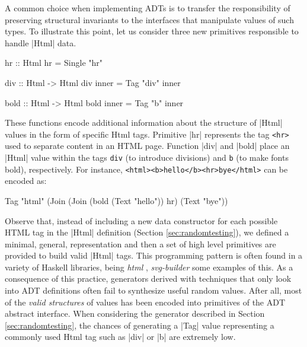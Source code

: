A common choice when implementing ADTs is to transfer the responsibility of
preserving structural invariants to the interfaces that manipulate values of
such types.
%
To illustrate this point, let us consider three new primitives responsible to
handle |Html| data.
%
\begin{code}
  hr :: Html
  hr = Single "hr"

  div :: Html -> Html
  div inner = Tag "div" inner

  bold :: Html -> Html
  bold inner = Tag "b" inner
\end{code}
%
%
These functions encode additional information about the structure of |Html|
values in the form of specific Html tags.
%
Primitive |hr| represents the tag \texttt{<hr>} used to separate content in an
HTML page.
%
Function |div| and |bold| place an |Html| value within the tags \texttt{div} (to
introduce divisions) and \texttt{b} (to make fonts bold), respectively.
%
For instance, \texttt{<html><b>hello</b><hr>bye</html>} can be
encoded as:
%
\begin{code}
Tag "html" (Join (Join
  (bold (Text "hello")) hr) (Text "bye"))
\end{code}
%
%
Observe that, instead of including a new data constructor for each possible HTML
tag in the |Html| definition (Section \ref{sec:randomtesting}), we defined a
minimal, general, representation and then a set of high level primitives are
provided to build valid |Html| tags.
%
%
This programming pattern is often
found in a variety of Haskell libraries, being \emph{html} \tocite,
\emph{svg-builder} \tocite some examples of this.
%
As a consequence of this practice, generators derived with techniques that only
look into ADT definitions \tocite often fail to synthesize useful random
values.
%
After all, most of the \emph{valid structures} of values has been encoded into
primitives of the ADT abstract interface.
%
When considering the generator described in Section \ref{sec:randomtesting}, the
chances of generating a |Tag| value representing a commonly used Html tag such
as |div| or |b| are extremely low.



